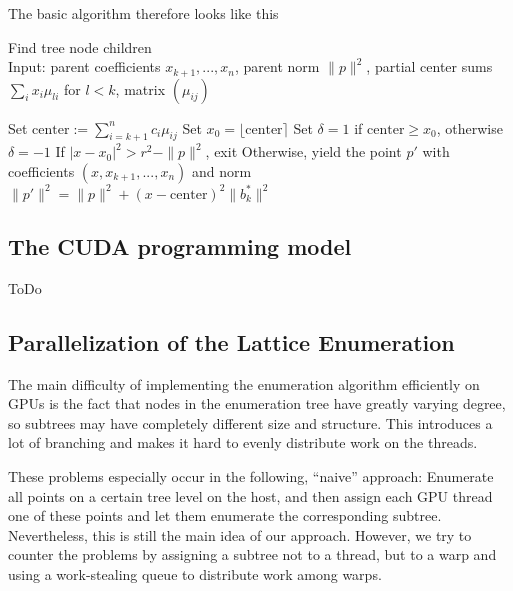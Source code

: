 \documentclass{scrartcl}
\begin{document}
    The basic algorithm therefore looks like this

    \begin{algorithm}[H]
        \caption{Find tree node children \label{alg:children_iter}\\Input: parent coefficients $x_{k + 1}, ..., x_n$, parent norm $\|p\|^2$, partial center sums $\sum_i x_i \mu_{li}$ for $l < k$, matrix $(\mu_{ij})$}
        \begin{algorithmic}
            \STATE Set $\mathrm{center} := \sum_{i = k + 1}^n c_i \mu_{ij}$
            \STATE Set $x_0 = \lfloor \mathrm{center} \rceil$
            \STATE Set $\delta = 1$ if $\mathrm{center} \geq x_0$, otherwise $\delta = -1$
                \STATE If $|x - x_0|^2 > r^2 - \| p \|^2$, exit
                \STATE Otherwise, yield the point $p'$ with coefficients $(x, x_{k + 1}, ..., x_n)$ and norm $\|p'\|^2 = \|p\|^2 + (x - \mathrm{center})^2 \|b_k^*\|^2$
            \ENDFOR
        \end{algorithmic}
    \end{algorithm}

    \subsection{The CUDA programming model}

    ToDo

    \subsection{Parallelization of the Lattice Enumeration}

    The main difficulty of implementing the enumeration algorithm efficiently on GPUs is the fact that nodes in the enumeration tree have greatly varying degree, so subtrees may have completely different size and structure. This introduces a lot of branching and makes it hard to evenly distribute work on the threads.

    These problems especially occur in the following, ``naive'' approach: Enumerate all points on a certain tree level on the host, and then assign each GPU thread one of these points and let them enumerate the corresponding subtree.
    Nevertheless, this is still the main idea of our approach. However, we try to counter the problems by assigning a subtree not to a thread, but to a warp and using a work-stealing queue to distribute work among warps.
\end{document}
